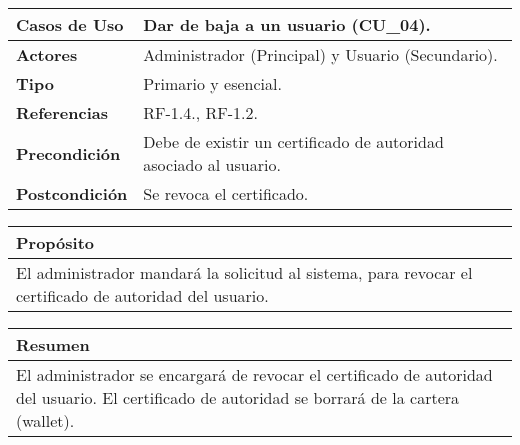\begin{itemize}
    \begin{table}[h!]
        \centering
        \begin{tabular}{|l|p{}|}
            \hline
            \textbf{Casos de Uso}   &   Dar de baja a un usuario (CU\_04). \\
            \hline 
            \textbf{Actores}        &   Administrador (Principal) y Usuario (Secundario). \\ 
            \hline 
            \textbf{Tipo}           &   Primario y esencial. \\ 
            \hline
            \textbf{Referencias}    &   RF-1.4., RF-1.2.\\ 
            \hline
            \textbf{Precondición}   &   Debe de existir un certificado de autoridad asociado al usuario.\\ 
            \hline
            \textbf{Postcondición}  &   Se revoca el certificado.\\ 
            \hline
        \end{tabular}
        
        \vspace{5mm}
        
        \begin{tabular}{|p{\textwidth}|}
            \hline
            \rowcolor{SeaGreen} \textbf{Propósito} \\
            \hline
            \multicolumn{1}{|p{12cm}|}{El administrador mandará la solicitud al sistema, para revocar el certificado
            de autoridad del usuario.} \\ [0.5ex]
            \hline
        \end{tabular}
        
        \vspace{5mm}
        
        \begin{tabular}{|p{\textwidth}|}
            \hline
            \rowcolor{SeaGreen} \textbf{Resumen} \\
            \hline
            \multicolumn{1}{|p{12cm}|}{El administrador se encargará de revocar el certificado de autoridad del usuario.
            El certificado de autoridad se borrará de la cartera (wallet).} \\ [0.5ex]
            \hline
        \end{tabular}
        
        \vspace{5mm}
        

\end{table}
\end{itemize}
